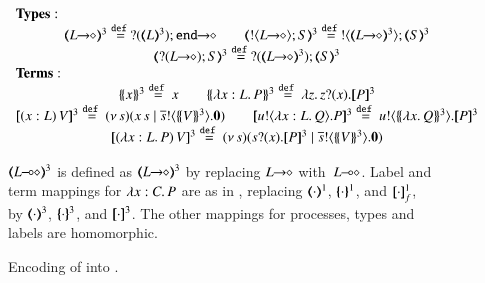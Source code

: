 \begin{figure}[t]
$
{%
\begin{array}{c}
	\multicolumn{1}{l}{\noindent{\bf Types:}}
	\\
	\tmap{\shot{L}}{3} \defeq \shot{\btinp{\tmap{L}{3}} \tinact}
	\qquad
	\tmap{\btout{\shot{L}} S}{3} \defeq \btout{\tmap{\shot{L}}{3}} \tmap{S}{3}
	\\
	\tmap{\btinp{\shot{L}} S}{3} \defeq \btinp{\tmap{\shot{L}}{3}} \tmap{S}{3}
	\\
	\multicolumn{1}{l}{\noindent{\bf Terms:}}
	\\
	\auxmap{x}{3} \defeq x
	\qquad
	\auxmap{\abs{x: L}{P}}{3} \defeq \abs{z}{\binp{z}{x} \pmap{P}{3}}
	\\
	\pmap{\appl{(x:L)}{V}}{3} \defeq \newsp{s}{\appl{x}{s} \Par \bout{\dual{s}}{\auxmap{V}{3}} \inact}
	\qquad
	\pmap{\bout{u}{\abs{x: L}{Q}} P}{3} \defeq \bout{u}{\auxmap{\abs{x}{Q}}{3} } \pmap{P}{3}
	\\
	\pmap{\appl{(\abs{x: L}{P})}{V}}{3} \defeq \newsp{s}{\binp{s}{x} \pmap{P}{3} \Par  \bout{\dual{s}}{\auxmap{V}{3}} \inact}
\end{array}
}
$

$\tmap{\lhot{L}}{3}$ is defined as $\tmap{\shot{L}}{3}$
by replacing $L\!\! \rightarrow\!\! \diamond$ with~$L\!\! \multimap\!\! \diamond$.
Label and term mappings for $\lambda x:C.\,P$ are
as in , replacing 
$(\!\!\langle\cdot\rangle\!\!)^{1}$,
$\{\!\!\{\cdot\}\!\!\}^{1}$, and 
$[\!\![\cdot]\!\!]^1_f$, by  
$(\!\!\langle\cdot\rangle\!\!)^{3}$,
$\{\!\!\{\cdot\}\!\!\}^{3}$, and 
$[\!\![\cdot]\!\!]^3$.
The other mappings for processes, types and labels are  homomorphic.

\caption{\label{f:enc:hopip_to_hopi} Encoding of \HOpp into \HOp.}
\end{figure} 

